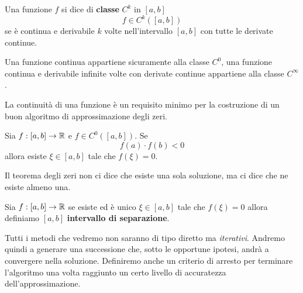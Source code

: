 \begin{definition}
	Una funzione $f$ si dice di \textbf{classe} $C^k$ in $[a, b]$
	\[ f \in C^k ([a, b]) \]
	se è continua e derivabile $k$ volte nell'intervallo $[a, b]$ con tutte le derivate continue.
\end{definition}

Una funzione continua appartiene sicuramente alla classe $C^0$, una funzione continua e derivabile infinite volte
con derivate continue appartiene alla classe $C^\infty$.

La continuità di una funzione è un requisito minimo per la costruzione di un buon algoritmo di approssimazione
degli zeri.

\begin{theorem}
	Sia $f : [a, b] \to \mathbb{R}$ e $f \in C^0 ([a, b])$. Se
	\[ f(a) \cdot f(b) < 0 \]
	allora esiste $\xi \in [a, b]$ tale che $f(\xi) = 0$.
\end{theorem}

Il teorema degli zeri non ci dice che esiste una sola soluzione, ma ci dice che ne esiste almeno una.

\begin{definition}
	Sia $f : [a, b] \to \mathbb{R}$ se esiste ed è unico $\xi \in [a, b]$ tale che $f(\xi) = 0$
	allora definiamo $[a, b]$ \textbf{intervallo di separazione}.
\end{definition}

Tutti i metodi che vedremo non saranno di tipo diretto ma \emph{iterativi}. Andremo quindi a generare una
successione che, sotto le opportune ipotesi, andrà a convergere nella soluzione. Definiremo anche un criterio
di arresto per terminare l'algoritmo una volta raggiunto un certo livello di accuratezza dell'approssimazione.

